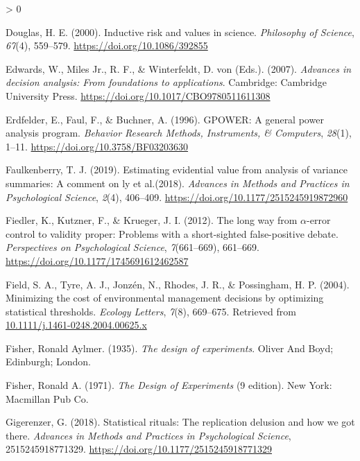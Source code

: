 \documentclass[
  english,
  ,jou, a4paper,floatsintext]{apa6}
\newlength{\cslhangindent}
\newenvironment{CSLReferences}[2] %
 {%
  \setlength{\parindent}{0pt}
  \ifodd #1 \everypar{\setlength{\hangindent}{\cslhangindent}}\ignorespaces\fi
  \ifnum #2 > 0
  \setlength{\parskip}{#2\baselineskip}
  \fi
 }%
 {}
\begin{document}
\begin{CSLReferences}{1}{0}
\leavevmode\hypertarget{ref-douglas_inductive_2000}{}%
Douglas, H. E. (2000). Inductive risk and values in science. \emph{Philosophy of Science}, \emph{67}(4), 559--579. \url{https://doi.org/10.1086/392855}

\leavevmode\hypertarget{ref-edwards_advances_2007}{}%
Edwards, W., Miles Jr., R. F., \& Winterfeldt, D. von (Eds.). (2007). \emph{Advances in decision analysis: {From} foundations to applications}. Cambridge: Cambridge University Press. \url{https://doi.org/10.1017/CBO9780511611308}

\leavevmode\hypertarget{ref-erdfelder_gpower_1996}{}%
Erdfelder, E., Faul, F., \& Buchner, A. (1996). {GPOWER}: {A} general power analysis program. \emph{Behavior Research Methods, Instruments, \& Computers}, \emph{28}(1), 1--11. \url{https://doi.org/10.3758/BF03203630}

\leavevmode\hypertarget{ref-faulkenberry2019estimating}{}%
Faulkenberry, T. J. (2019). Estimating evidential value from analysis of variance summaries: A comment on ly et al.(2018). \emph{Advances in Methods and Practices in Psychological Science}, \emph{2}(4), 406--409. \url{https://doi.org/10.1177/2515245919872960}

\leavevmode\hypertarget{ref-fiedler_long_2012}{}%
Fiedler, K., Kutzner, F., \& Krueger, J. I. (2012). The long way from {\(\alpha\)}-error control to validity proper: {Problems with} a short-sighted false-positive debate. \emph{Perspectives on Psychological Science}, \emph{7}(661--669), 661--669. \url{https://doi.org/10.1177/1745691612462587}

\leavevmode\hypertarget{ref-field_minimizing_2004}{}%
Field, S. A., Tyre, A. J., Jonzén, N., Rhodes, J. R., \& Possingham, H. P. (2004). Minimizing the cost of environmental management decisions by optimizing statistical thresholds. \emph{Ecology Letters}, \emph{7}(8), 669--675. Retrieved from \href{https://10.1111/j.1461-0248.2004.00625.x}{10.1111/j.1461-0248.2004.00625.x}

\leavevmode\hypertarget{ref-fisher_design_1935}{}%
Fisher, Ronald Aylmer. (1935). \emph{The design of experiments}. {Oliver And Boyd; Edinburgh; London}.

\leavevmode\hypertarget{ref-fisher_design_1971}{}%
Fisher, Ronald A. (1971). \emph{The {Design} of {Experiments}} (9 edition). New York: Macmillan Pub Co.

\leavevmode\hypertarget{ref-gigerenzer_statistical_2018}{}%
Gigerenzer, G. (2018). Statistical rituals: The replication delusion and how we got there. \emph{Advances in Methods and Practices in Psychological Science}, 2515245918771329. \url{https://doi.org/10.1177/2515245918771329}


\end{CSLReferences}
\end{document}
